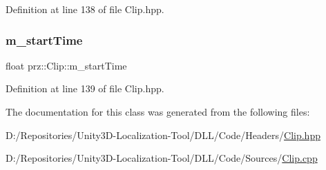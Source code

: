 Definition at line 138 of file Clip.\+hpp.

\mbox{\label{classprz_1_1_clip_ae9023bc80aedb38fcf1b9bc619a6f70c}} 
\subsubsection{\texorpdfstring{m\_startTime}{m\_startTime}}
{\footnotesize\ttfamily float prz\+::\+Clip\+::m\+\_\+start\+Time\hspace{0.3cm}{\ttfamily [protected]}}



Definition at line 139 of file Clip.\+hpp.



The documentation for this class was generated from the following files\+:\begin{DoxyCompactItemize}
\item 
D\+:/\+Repositories/\+Unity3\+D-\/\+Localization-\/\+Tool/\+D\+L\+L/\+Code/\+Headers/\mbox{\hyperlink{_clip_8hpp}{Clip.\+hpp}}\item 
D\+:/\+Repositories/\+Unity3\+D-\/\+Localization-\/\+Tool/\+D\+L\+L/\+Code/\+Sources/\mbox{\hyperlink{_clip_8cpp}{Clip.\+cpp}}\end{DoxyCompactItemize}
